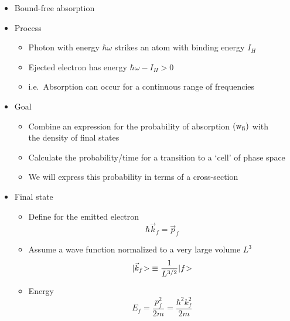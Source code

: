 \documentclass[12pt,letterpaper]{article}
\begin{document}
\begin{Aenumerate}
\begin{itemize}
  	\item Bound-free absorption
  	\item Process 
	\begin{itemize}
	\item Photon with energy $\hbar \omega$ strikes an atom with binding
	energy $I_H$
	\item Ejected electron has energy $\hbar\omega - I_H > 0$
	\item i.e.\ Absorption can occur for a continuous range of frequencies
	\end{itemize}
  \item Goal
	\begin{itemize}
	\item Combine an expression for the probability of absorption
	$({\rm w_{fi}})$ with \\ the density of final states
	\item Calculate the probability/time for a transition to a 
	`cell' of phase space
	\item We will express this probability in terms of a cross-section
	\end{itemize}
  \item Final state
	\begin{itemize}
	\item Define for the emitted electron
	\begin{equation}
	\hbar \vec k_f = \vec p_f
	\end{equation}
	\item Assume a wave function normalized to a very large volume $L^3$
	\begin{equation}
	{|\vec k_f\negmedspace>} \equiv \frac{1}{L^{3/2}} {|f\negmedspace>}
	\end{equation}

  	\item Energy
	\begin{equation}
	E_f = \frac{p_f^2}{2m} = \frac{\hbar^2 k_f^2}{2m}
	\end{equation}
	\end{itemize}


\end{itemize}
\end{Aenumerate}
\end{document}

